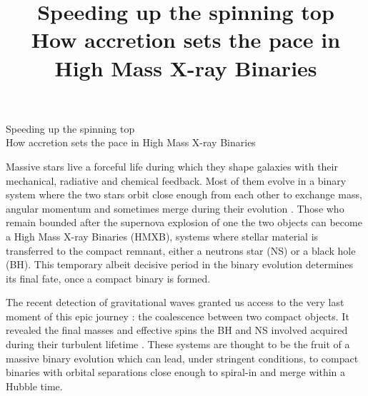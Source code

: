 \documentclass[letterpaper,12pt,onecolumn]{article}
\title{	
\vspace*{-2.5cm}
\Large Speeding up the spinning top\\
\large How accretion sets the pace in High Mass X-ray Binaries  \\ %
}
\author{\tiny} %
\date{\tiny }%
\makeatletter
\newcommand*{\hmxb}{HMXB\@\xspace}
\newcommand*{\ns}{NS\@\xspace}
\newcommand*{\bh}{BH\@\xspace}
\makeatother
\begin{document}


\renewcommand{\headrulewidth}{0pt}
\pagestyle{fancy}
\rhead{}
\rfoot{\thepage / \pageref{LastPage}}

\vspace*{-1.6cm}
\begin{center}
\Large Speeding up the spinning top\\
\large How accretion sets the pace in High Mass X-ray Binaries 
\end{center}
\normalfont

\vspace*{0.7cm}

Massive stars live a forceful life during which they shape galaxies with their mechanical, radiative and chemical feedback. Most of them evolve in a binary system where the two stars orbit close enough from each other to exchange mass, angular momentum and sometimes merge during their evolution \citep{DeMink2012}. Those who remain bounded after the supernova explosion of one the two objects can become a High Mass X-ray Binaries (\hmxb), systems where stellar material is transferred to the compact remnant, either a neutrons star (\ns) or a black hole (\bh). This temporary albeit decisive period in the binary evolution determines its final fate, once a compact binary is formed.

The recent detection of gravitational waves granted us access to the very last moment of this epic journey : the coalescence between two compact objects. It revealed the final masses and effective spins the \bh and \ns involved acquired during their turbulent lifetime \citep{TheLIGOScientificCollaboration2017}. These systems are thought to be the fruit of a massive binary evolution which can lead, under stringent conditions, to compact binaries with orbital separations close enough to spiral-in and merge within a Hubble time. 

\end{document}
